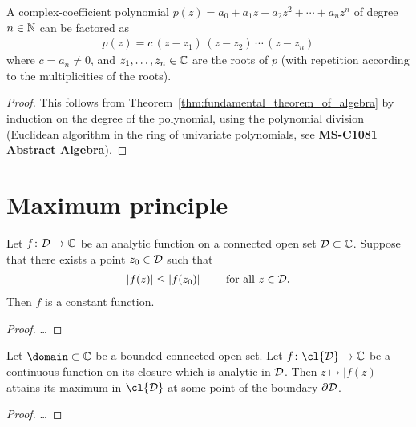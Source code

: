 \begin{corollary}
  \label{cor:complex_polynomial_factorization}
  A complex-coefficient
  polynomial $p(z) = a_0 + a_1 z + a_2 z^2 + \cdots + a_n z^n$
  of degree $n \in \mathbb{N}$ can be factored as
  \begin{align*}
    p(z) = c \, (z - z_1) \, (z - z_2) \, \cdots \, (z - z_n)
  \end{align*}
  where $c = a_n \ne 0$, and $z_1 , \ldots, z_n \in \mathbb{C}$
  are the roots of $p$ (with repetition according to the
  multiplicities of the roots).
\end{corollary}
\begin{proof}
  This follows from Theorem~\ref{thm:fundamental_theorem_of_algebra}
  by induction on the degree of the polynomial,
  using the polynomial division (Euclidean algorithm in the
  ring of univariate polynomials, see \textbf{MS-C1081 Abstract Algebra}).
\end{proof}



\section{Maximum principle}

\begin{theorem}
  \label{thm:maximum_principle}
  Let $f \colon \mathcal{D} \to \mathbb{C}$ be an analytic function on a
  connected open set $\mathcal{D} \subset \mathbb{C}$.
  Suppose that there exists a point $z_0 \in \mathcal{D}$
  such that
  \begin{align*}
    |f(z)| \le |f(z_0)| \qquad \text{ for all } z \in \mathcal{D} .
  \end{align*}
  Then $f$ is a constant function.
\end{theorem}
\begin{proof}
  \ldots
\end{proof}

\begin{corollary}
  \label{cor:maximum_modulus_on_boundary}
  Let $\domain \subset \bC$ be a bounded connected open set.
  Let $f \colon \cl{\Domain} \to \bC$ be a continuous function
  on its closure which is analytic in $\mathcal{D}$.
  Then $z \mapsto |f(z)|$ attains its maximum in $\cl{\Domain}$
  at some point of the boundary $\partial \mathcal{D}$.
\end{corollary}
\begin{proof}
  \ldots
\end{proof}

